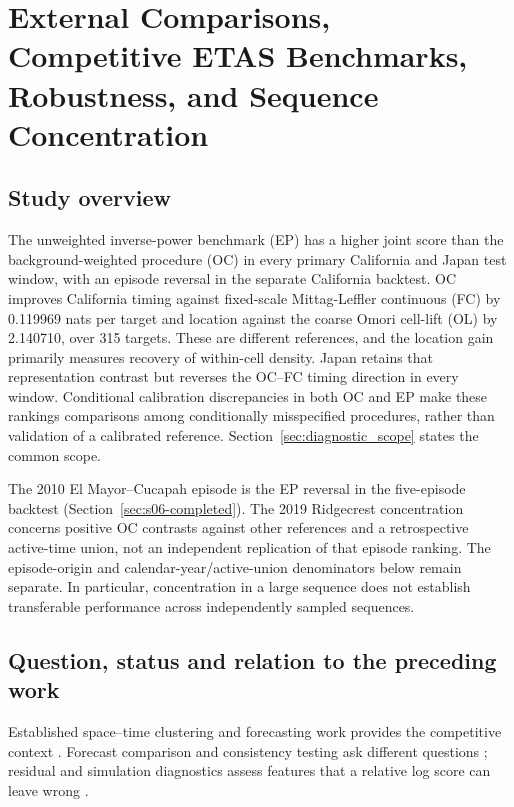 \chapter{External Comparisons, Competitive ETAS Benchmarks, Robustness, and Sequence Concentration}
\label{ch:external}
\section{Study overview}

The unweighted inverse-power benchmark (EP) has a higher joint score than the background-weighted procedure (OC) in every primary California and Japan test window, with an episode reversal in the separate California backtest. OC improves California timing against fixed-scale Mittag-Leffler continuous (FC) by 0.119969 nats per target and location against the coarse Omori cell-lift (OL) by 2.140710, over 315 targets. These are different references, and the location gain primarily measures recovery of within-cell density. Japan retains that representation contrast but reverses the OC--FC timing direction in every window. Conditional calibration discrepancies in both OC and EP make these rankings comparisons among conditionally misspecified procedures, rather than validation of a calibrated reference. Section~\ref{sec:diagnostic_scope} states the common scope.

The 2010 El Mayor--Cucapah episode is the EP reversal in the five-episode
backtest (Section~\ref{sec:s06-completed}). The 2019 Ridgecrest concentration
concerns positive OC contrasts against other references and a retrospective
active-time union, not an independent replication of that episode ranking.
The episode-origin and calendar-year/active-union denominators below remain
separate. In particular, concentration in a large sequence does not establish
transferable performance across independently sampled sequences.

\section{Question, status and relation to the preceding work}

Established space--time clustering and forecasting work provides the
competitive context \citep{ConsoleMurru2001,HelmstetterKaganJackson2006,WernerEtAl2011}.
Forecast comparison and consistency testing ask different questions
\citep{RhoadesEtAl2011}; residual and simulation diagnostics assess features
that a relative log score can leave wrong \citep{BraySchoenberg2013}.

